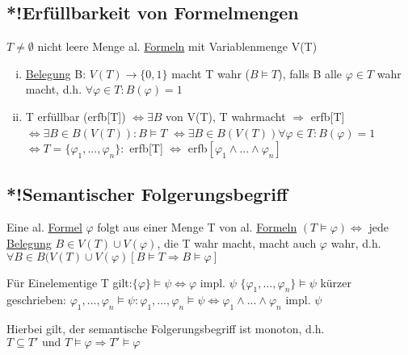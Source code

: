 \documentclass[12pt,a4paper]{article} %
\begin{document}
	\subsection{*!Erfüllbarkeit von Formelmengen}
	\label{Erfullbar}
	$T \ne \emptyset$ nicht leere Menge al. \hyperref[Formel]{Formeln} mit Variablenmenge V(T)
	
	\begin{enumerate}[(i)]
		\item \hyperref[Belegung]{Belegung} B: $V(T) \rightarrow\{0, 1\}$ macht T wahr ($B \vDash T$), falls B alle $\varphi \in T$ wahr macht, d.h. $\forall \varphi \in T: B(\varphi) = 1$
		\item T erfüllbar (erfb[T]) $\Leftrightarrow \exists B$ von V(T), T wahrmacht \newline
		$\Rightarrow$ erfb[T] $\Leftrightarrow \exists B \in B(V(T)): B \vDash T$ \newline
		$\Leftrightarrow \exists B \in B(V(T)) \forall \varphi \in T: B(\varphi) = 1$ \newline
		$\Leftrightarrow T = \{\varphi_1, ..., \varphi_n\}:$ erfb[T] $\Leftrightarrow$ erfb$[\varphi_1 \land ... \land \varphi_n]$
	\end{enumerate}
	
	\subsection{*!Semantischer Folgerungsbegriff}
	Eine al. \hyperref[Formel]{Formel} $\varphi$ folgt aus einer Menge T von al. \hyperref[Formel]{Formeln} $(T \hyperref[Erfullbar]{\vDash} \varphi) \Leftrightarrow$ jede \hyperref[Belegung]{Belegung} $B \in V(T) \cup V(\varphi)$, die T wahr macht, macht auch $\varphi$ wahr, d.h. $\forall B \in B(V(T) \cup V(\varphi) [B \hyperref[Erfullbar]{\vDash} T \Rightarrow B \hyperref[Erfullbar]{\vDash} \varphi]$ 
	
	Für Einelementige T gilt:$\{\varphi\} \hyperref[Erfullbar]{\vDash} \psi \Leftrightarrow \varphi$ impl. $\psi$ \newline
	$\{\varphi_1, ..., \varphi_n\} \hyperref[Erfullbar]{\vDash} \psi$ kürzer geschrieben: \newline $\varphi_1, ..., \varphi_n \hyperref[Erfullbar]{\vDash} \psi: \varphi_1, ..., \varphi_n \hyperref[Erfullbar]{\vDash} \psi \Leftrightarrow \varphi_1 \land ... \land \varphi_n$ impl. $\psi$
	
	Hierbei gilt, der semantische Folgerungsbegriff ist monoton, d.h. \newline
	$T \subseteq T'\text{ und } T \hyperref[Erfullbar]{\vDash} \varphi \Rightarrow T' \hyperref[Erfullbar]{\vDash} \varphi$
	
\end{document}
